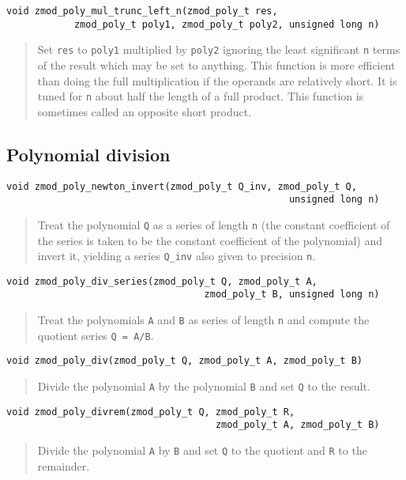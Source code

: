 \documentclass[a4paper,10pt]{article}
\newcommand{\code}{\lstinline}
\begin{document}
\begin{lstlisting}
void zmod_poly_mul_trunc_left_n(zmod_poly_t res, 
            zmod_poly_t poly1, zmod_poly_t poly2, unsigned long n)
\end{lstlisting}
\begin{quote}
Set \code{res} to \code{poly1} multiplied by \code{poly2} ignoring the least significant \code{n} terms of the result which may be set to anything. This function is more efficient than doing the full multiplication if the operands are relatively short. It is tuned for \code{n} about half the length of a full product. This function is sometimes called an opposite short product. 
\end{quote}

\subsection{Polynomial division}
\begin{lstlisting}
void zmod_poly_newton_invert(zmod_poly_t Q_inv, zmod_poly_t Q, 
                                                  unsigned long n)
\end{lstlisting}
\begin{quote}
Treat the polynomial \code{Q} as a series of length \code{n} (the constant coefficient of the series is taken to be the constant coefficient of the polynomial) and invert it, yielding a series \code{Q_inv} also given to precision \code{n}. 
\end{quote}

\begin{lstlisting}
void zmod_poly_div_series(zmod_poly_t Q, zmod_poly_t A, 
                                   zmod_poly_t B, unsigned long n)
\end{lstlisting}
\begin{quote}
Treat the polynomials \code{A} and \code{B} as series of length \code{n} and compute the quotient series \code{Q = A/B}.
\end{quote}

\begin{lstlisting}
void zmod_poly_div(zmod_poly_t Q, zmod_poly_t A, zmod_poly_t B)
\end{lstlisting}
\begin{quote}
Divide the polynomial \code{A} by the polynomial \code{B} and set \code{Q} to the result.
\end{quote}

\begin{lstlisting}
void zmod_poly_divrem(zmod_poly_t Q, zmod_poly_t R, 
                                     zmod_poly_t A, zmod_poly_t B)
\end{lstlisting}
\begin{quote}
Divide the polynomial \code{A} by \code{B} and set \code{Q} to the quotient and \code{R} to the remainder.
\end{quote}
\end{document}
